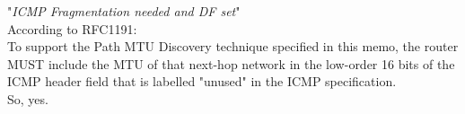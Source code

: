 "\textit{ICMP Fragmentation needed and DF set}"\\
According to RFC1191: \\
 To support the Path MTU Discovery technique specified in this memo, the router MUST include the MTU of that next-hop network in the low-order 16 bits of the ICMP header field that is labelled "unused" in the ICMP specification.\\
 So, yes.
